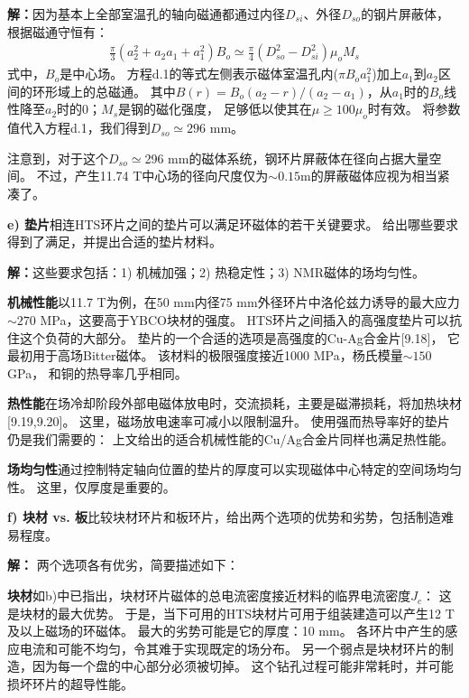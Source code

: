 \textbf{解：}因为基本上全部室温孔的轴向磁通都通过内径$D_{si}$、外径$D_{so}$的钢片屏蔽体，根据磁通守恒有：
\begin{align*}%
\frac{\pi}{3}(a_{2}^{2}+a_2a_1+a_{1}^{2})B_o\simeq\frac{\pi}{4}(D_{so}^{2}-D_{si}^{2})\mu_oM_s \tag{d.1}
\end{align*}
式中，$B_o$是中心场。
方程d.1的等式左侧表示磁体室温孔内($\pi B_o a_1^2$)加上$a_1$到$a_2$区间的环形域上的总磁通。
其中$B(r)=B_o(a_2-r)/(a_2-a_1)$，从$a_1$时的$B_o$线性降至$a_2$时的0；$M_s$是钢的磁化强度，
足够低以使其在$\mu\ge100\mu_o$时有效。
将参数值代入方程d.1，我们得到$D_{so}\simeq 296$ mm。

注意到，对于这个$D_{so}\simeq$296 mm的磁体系统，钢环片屏蔽体在径向占据大量空间。
不过，产生11.74 T中心场的径向尺度仅为$\sim 0.15$m的屏蔽磁体应视为相当紧凑了。

\textbf{e) 垫片}\qquad 相连HTS环片之间的垫片可以满足环磁体的若干关键要求。
给出哪些要求得到了满足，并提出合适的垫片材料。

\textbf{解：}这些要求包括：1) 机械加强；2) 热稳定性；3) NMR磁体的场均匀性。

\textbf{机械性能}\qquad 以11.7 T为例，在50 mm内径75 mm外径环片中洛伦兹力诱导的最大应力
$\sim 270$ MPa，这要高于YBCO块材的强度。
HTS环片之间插入的高强度垫片可以抗住这个负荷的大部分。
垫片的一个合适的选项是高强度的Cu-Ag合金片[9.18]，
它最初用于高场Bitter磁体。
该材料的极限强度接近1000 MPa，杨氏模量$\sim 150$ GPa，
和铜的热导率几乎相同。

\textbf{热性能}\qquad 在场冷却阶段外部电磁体放电时，交流损耗，主要是磁滞损耗，将加热块材[9.19,9.20]。
这里，磁场放电速率可减小以限制温升。
使用强而热导率好的垫片仍是我们需要的：
上文给出的适合机械性能的Cu/Ag合金片同样也满足热性能。

\textbf{场均匀性}\qquad 通过控制特定轴向位置的垫片的厚度可以实现磁体中心特定的空间场均匀性。
这里，仅厚度是重要的。

\textbf{f) 块材 vs. 板}\qquad 比较块材环片和板环片，给出两个选项的优势和劣势，包括制造难易程度。

\textbf{解：} 两个选项各有优劣，简要描述如下：

\textbf{块材}\qquad 如b)中已指出，块材环片磁体的总电流密度接近材料的临界电流密度$J_c$：
这是块材的最大优势。
于是，当下可用的HTS块材片可用于组装建造可以产生12 T及以上磁场的环磁体。
最大的劣势可能是它的厚度：10 mm。
各环片中产生的感应电流和可能不均匀，令其难于实现既定的场分布。
另一个弱点是块材环片的制造，因为每一个盘的中心部分必须被切掉。
这个钻孔过程可能非常耗时，并可能损坏环片的超导性能。

